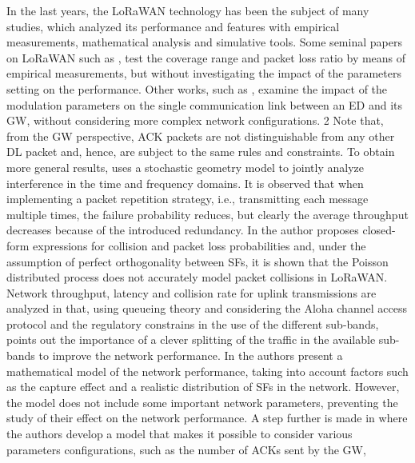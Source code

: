 




In the last years,
	the LoRaWAN technology has been the subject of many studies,
	which analyzed its performance and features with empirical measurements,
	mathematical analysis and simulative tools.
Some seminal papers on LoRaWAN such as \cite{petajajarvi_coverage_2015b},
	\cite{wixted_evaluation_2016} test the coverage range and packet loss ratio by means of empirical measurements,
	but without investigating the impact of the parameters setting on the performance.
Other works,
	such as \cite{bor_lora_2017},
	examine the impact of the modulation parameters on the single communication link between an ED and its GW,
	without considering more complex network configurations.
2 Note that,
	from the GW perspective,
	ACK packets are not distinguishable from any other DL packet and,
	hence,
	are subject to the same rules and constraints.
To obtain more general results,
	\cite{li_2d_2016} uses a stochastic geometry model to jointly analyze interference in the time and frequency domains.
It is observed that when implementing a packet repetition strategy,
	i.e.,
	transmitting each message multiple times,
	the failure probability reduces,
	but clearly the average throughput decreases because of the introduced redundancy.
In \cite{ferre_collision_2017a} the author proposes closed-form expressions for collision and packet loss probabilities and,
	under the assumption of perfect orthogonality between SFs,
	it is shown that the Poisson distributed process does not accurately model packet collisions in LoRaWAN.
Network throughput,
	latency and collision rate for uplink transmissions are analyzed in \cite{sorensen_analysis_2017} that,
	using queueing theory and considering the Aloha channel access protocol and the regulatory constrains in the use of the different sub-bands,
	points out the importance of a clever splitting of the traffic in the available sub-bands to improve the network performance.
In \cite{bankov_mathematical_2017a} the authors present a mathematical model of the network performance,
	taking into account factors such as the capture effect and a realistic distribution of SFs in the network.
However,
	the model does not include some important network parameters,
	preventing the study of their effect on the network performance.
A step further is made in \cite{capuzzo_mathematical_2018} where the authors develop a model that makes it possible to consider various parameters configurations,
	such as the number of ACKs sent by the GW,
